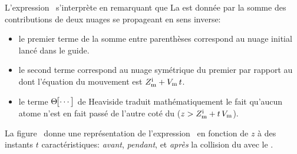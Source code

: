 \casse

\noindent
L'expression~ s'interprète en remarquant que La \dat est donnée par la somme des contributions de deux nuages se propageant en sens inverse:
\begin{itemize}
	\item le premier terme de la somme entre parenthèses correspond au nuage initial lancé dans le guide.
	\item le second terme correspond au nuage symétrique du premier par rapport au \mimo dont l'équation du mouvement est $Z_{\mathrm {m}}^{\mathrm i} + V_{\rm {m}}\,t$.
	\item le terme $\Heaviside{\cdots}$ de Heaviside traduit mathématiquement le fait qu'aucun atome n'est en fait passé de l'autre coté du \mimo ($z > Z_{\mathrm {m}}^{\mathrm i} + t\,V_{\rm {m}}$).
\end{itemize}


\noindent
La figure~ donne une représentation de l'expression~ en fonction de $z$ à des instants $t$ caractéristiques: \emph{avant}, \emph{pendant}, et \emph{après} la collision du \pat avec le \mimo.%

\bfigs
%
\label{fig:NtPaquetResultat}
\efig

%



